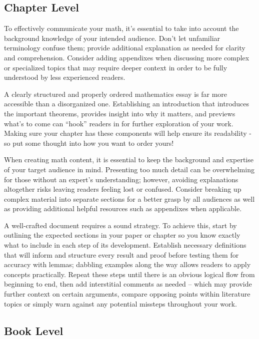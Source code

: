 \documentclass[
  twoside,
  12pt,
  letterpaper,
  fleqn]{article}
\begin{document}
\hypertarget{chapter-level}{%
\subsection{Chapter Level}\label{chapter-level}}

To effectively communicate your math, it's essential to take into
account the background knowledge of your intended audience. Don't let
unfamiliar terminology confuse them; provide additional explanation as
needed for clarity and comprehension. Consider adding appendixes when
discussing more complex or specialized topics that may require deeper
context in order to be fully understood by less experienced readers.

A clearly structured and properly ordered mathematics essay is far more
accessible than a disorganized one. Establishing an introduction that
introduces the important theorems, provides insight into why it matters,
and previews what's to come can ``hook'' readers in for further
exploration of your work. Making sure your chapter has these components
will help ensure its readability - so put some thought into how you want
to order yours!

When creating math content, it is essential to keep the background and
expertise of your target audience in mind. Presenting too much detail
can be overwhelming for those without an expert's understanding;
however, avoiding explanations altogether risks leaving readers feeling
lost or confused. Consider breaking up complex material into separate
sections for a better grasp by all audiences as well as providing
additional helpful resources such as appendixes when applicable.

A well-crafted document requires a sound strategy. To achieve this,
start by outlining the expected sections in your paper or chapter so you
know exactly what to include in each step of its development. Establish
necessary definitions that will inform and structure every result and
proof before testing them for accuracy with lemmas; dabbling examples
along the way allows readers to apply concepts practically. Repeat these
steps until there is an obvious logical flow from beginning to end, then
add interstitial comments as needed -- which may provide further context
on certain arguments, compare opposing points within literature topics
or simply warn against any potential missteps throughout your work.

\hypertarget{book-level}{%
\subsection{Book Level}\label{book-level}}
\end{document}
